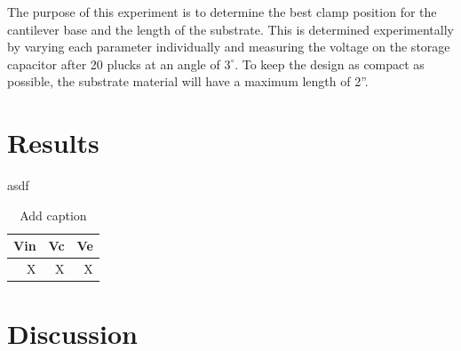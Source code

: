 \documentclass[aps,prl,twocolumn,groupedaddress]{revtex4}
\begin{document}
The purpose of this experiment is to determine the best clamp position for the cantilever base and the length of the substrate. This is determined experimentally by varying each parameter individually and measuring the voltage on the storage capacitor after 20 plucks at an angle of $3^\circ$. To keep the design as compact as possible, the substrate material will have a maximum length of 2''. 

\section{Results}

asdf

\begin{table}[htbp]
  \centering
  \caption{Add caption}
    \begin{tabular}{rrr}
    \toprule
    \textbf{Vin} & \textbf{Vc} & \textbf{Ve} \\
    \midrule
    X     &  X   & X  \\

    \bottomrule
    \end{tabular}%
  \label{tab:addlabel}%
\end{table}%






\section{Discussion}

\vfill
\end{document}
